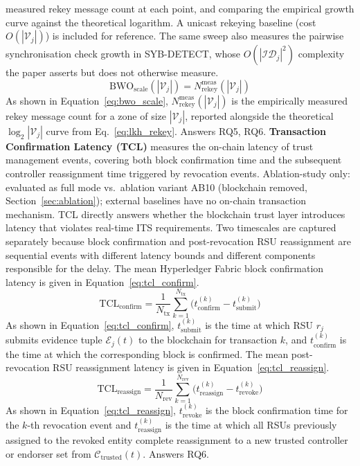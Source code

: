 \documentclass[12pt, a4paper]{report}
\begin{document}
measured rekey message count at each point, and comparing
the empirical growth curve against the theoretical logarithm.
A unicast rekeying baseline (cost $O(|\mathcal{V}_j|)$) is
included for reference. The same sweep also measures the
pairwise synchronisation check growth in SYB-DETECT, whose
$O(|\mathcal{ID}_j|^2)$ complexity the paper asserts but does
not otherwise measure.
\begin{equation}
  \mathrm{BWO}_{\mathrm{scale}}(|\mathcal{V}_j|) =
    N_{\mathrm{rekey}}^{\mathrm{meas}}(|\mathcal{V}_j|)
  \label{eq:bwo_scale}
\end{equation}
As shown in Equation~\ref{eq:bwo_scale},
$N_{\mathrm{rekey}}^{\mathrm{meas}}(|\mathcal{V}_j|)$ is the
empirically measured rekey message count for a zone of size
$|\mathcal{V}_j|$, reported alongside the theoretical
$\log_2|\mathcal{V}_j|$ curve from Eq.~\ref{eq:lkh_rekey}.
Answers RQ5, RQ6.
\newline
\newline
\textbf{Transaction Confirmation Latency (TCL)} measures the
on-chain latency of trust management events, covering both
block confirmation time and the subsequent controller
reassignment time triggered by revocation events.
Ablation-study only: evaluated as full mode
vs.\ ablation variant AB10 (blockchain removed,
Section~\ref{sec:ablation}); external baselines have no on-chain
transaction mechanism.
\newline
\newline
TCL directly answers whether the blockchain trust layer
introduces latency that violates real-time ITS requirements.
Two timescales are captured separately because block
confirmation and post-revocation RSU reassignment are
sequential events with different latency bounds and
different components responsible for the delay.
The mean Hyperledger Fabric block confirmation latency
is given in Equation~\ref{eq:tcl_confirm}.
\begin{equation}
  \mathrm{TCL}_{\mathrm{confirm}} =
    \frac{1}{N_{\mathrm{tx}}}
    \sum_{k=1}^{N_{\mathrm{tx}}}
    \bigl(t_{\mathrm{confirm}}^{(k)}
    - t_{\mathrm{submit}}^{(k)}\bigr)
  \label{eq:tcl_confirm}
\end{equation}
As shown in Equation~\ref{eq:tcl_confirm},
$t_{\mathrm{submit}}^{(k)}$ is the time at which RSU $r_j$
submits evidence tuple $\mathcal{E}_j(t)$ to the blockchain
for transaction $k$, and $t_{\mathrm{confirm}}^{(k)}$ is the
time at which the corresponding block is confirmed.
The mean post-revocation RSU reassignment latency is given in
Equation~\ref{eq:tcl_reassign}.
\begin{equation}
  \mathrm{TCL}_{\mathrm{reassign}} =
    \frac{1}{N_{\mathrm{rev}}}
    \sum_{k=1}^{N_{\mathrm{rev}}}
    \bigl(t_{\mathrm{reassign}}^{(k)}
    - t_{\mathrm{revoke}}^{(k)}\bigr)
  \label{eq:tcl_reassign}
\end{equation}
As shown in Equation~\ref{eq:tcl_reassign},
$t_{\mathrm{revoke}}^{(k)}$ is the block confirmation time
for the $k$-th revocation event and
$t_{\mathrm{reassign}}^{(k)}$ is the time at which all RSUs
previously assigned to the revoked entity complete
reassignment to a new trusted controller or endorser set
from $\mathcal{C}_{\mathrm{trusted}}(t)$. Answers RQ6.
\end{document}
